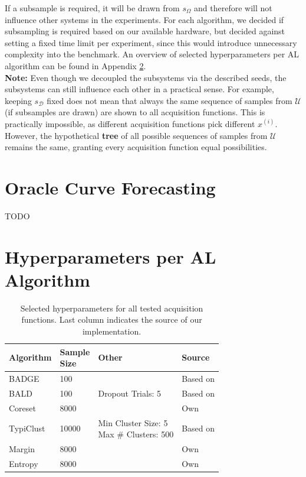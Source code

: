 \documentclass[]{article}
\begin{document}
If a subsample is required, it will be drawn from $s_\Omega$ and therefore will not influence other systems in the experiments.
For each algorithm, we decided if subsampling is required based on our available hardware, but decided against setting a fixed time limit per experiment, since this would introduce unnecessary complexity into the benchmark.
An overview of selected hyperparameters per AL algorithm can be found in Appendix \ref{app:agent_hyperparameters}. \\
\textbf{Note:} Even though we decoupled the subsystems via the described seeds, the subsystems can still influence each other in a practical sense. 
For example, keeping $s_\mathcal{D}$ fixed does not mean that always the same sequence of samples from $\mathcal{U}$ (if subsamples are drawn) are shown to all acquisition functions. 
This is practically impossible, as different acquisition functions pick different $x^{(i)}$.
However, the hypothetical \textbf{tree} of all possible sequences of samples from $\mathcal{U}$ remains the same, granting every acquisition function equal possibilities.


\section{Oracle Curve Forecasting}\label{app:oracle_forecasting}
TODO

\section{Hyperparameters per AL Algorithm}\label{app:agent_hyperparameters}
\begin{table}[H]
    \caption{Selected hyperparameters for all tested acquisition functions. Last column indicates the source of our implementation.}
	\centering
	\begin{tabular}{l || l | l | l}
		Algorithm & \makecell{Sample\\Size} & Other & Source\\
		\hline
		BADGE & 100 & & Based on \cite{ashdeep, curelab}\\
		BALD & 100 & Dropout Trials: 5 & Based on \cite{pycls} \\
		Coreset & 8000 & & Own \\
		TypiClust & 10000 & \makecell[tl]{Min Cluster Size: 5\\Max \# Clusters: 500} & Based on \cite{hacohen2022active} \\
		Margin & 8000 & & Own\\
		Entropy & 8000 &  & Own\\
	\end{tabular}
\end{table}
\end{document}

